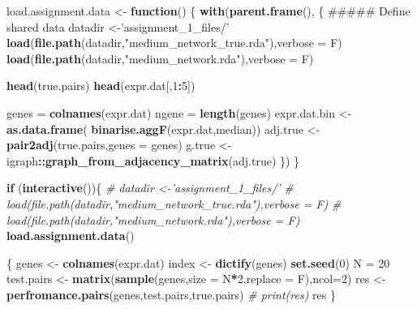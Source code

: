 \documentclass[]{article}
\newenvironment{Shaded}{\begin{snugshade}}{\end{snugshade}}
\newcommand{\KeywordTok}[1]{\textcolor[rgb]{0.13,0.29,0.53}{\textbf{#1}}}
\newcommand{\DataTypeTok}[1]{\textcolor[rgb]{0.13,0.29,0.53}{#1}}
\newcommand{\DecValTok}[1]{\textcolor[rgb]{0.00,0.00,0.81}{#1}}
\newcommand{\StringTok}[1]{\textcolor[rgb]{0.31,0.60,0.02}{#1}}
\newcommand{\CommentTok}[1]{\textcolor[rgb]{0.56,0.35,0.01}{\textit{#1}}}
\newcommand{\ControlFlowTok}[1]{\textcolor[rgb]{0.13,0.29,0.53}{\textbf{#1}}}
\newcommand{\OperatorTok}[1]{\textcolor[rgb]{0.81,0.36,0.00}{\textbf{#1}}}
\newcommand{\NormalTok}[1]{#1}
\theoremstyle{definition}
\theoremstyle{definition}
\theoremstyle{definition}
\theoremstyle{remark}
\begin{document}
\begin{Shaded}
\begin{Highlighting}[]
{{{{{\NormalTok{load.assignment.data <-}\StringTok{ }\ControlFlowTok{function}\NormalTok{()}
\NormalTok{\{}
  \KeywordTok{with}\NormalTok{(}\KeywordTok{parent.frame}\NormalTok{(),}
\NormalTok{       \{}
\NormalTok{         ##### Define shared data}
\NormalTok{         datadir <-}\StringTok{'assignment_1_files/'}
         \KeywordTok{load}\NormalTok{(}\KeywordTok{file.path}\NormalTok{(datadir,}\StringTok{"medium_network_true.rda"}\NormalTok{),}\DataTypeTok{verbose =}\NormalTok{ F)}
         \KeywordTok{load}\NormalTok{(}\KeywordTok{file.path}\NormalTok{(datadir,}\StringTok{"medium_network.rda"}\NormalTok{),}\DataTypeTok{verbose =}\NormalTok{ F)}
         
         \KeywordTok{head}\NormalTok{(true.pairs)}
         \KeywordTok{head}\NormalTok{(expr.dat[,}\DecValTok{1}\OperatorTok{:}\DecValTok{5}\NormalTok{])}
         
\NormalTok{         genes =}\StringTok{ }\KeywordTok{colnames}\NormalTok{(expr.dat)}
\NormalTok{         ngene =}\StringTok{ }\KeywordTok{length}\NormalTok{(genes)}
\NormalTok{         expr.dat.bin <-}\StringTok{ }\KeywordTok{as.data.frame}\NormalTok{( }\KeywordTok{binarise.aggF}\NormalTok{(expr.dat,median))}
\NormalTok{         adj.true <-}\StringTok{ }\KeywordTok{pair2adj}\NormalTok{(true.pairs,}\DataTypeTok{genes =}\NormalTok{ genes)}
\NormalTok{         g.true <-}\StringTok{ }\NormalTok{igraph}\OperatorTok{::}\KeywordTok{graph_from_adjacency_matrix}\NormalTok{(adj.true)}
\NormalTok{       \})}
\NormalTok{\}}

\ControlFlowTok{if}\NormalTok{ (}\KeywordTok{interactive}\NormalTok{())\{}
  \CommentTok{# datadir <-'assignment_1_files/'}
  \CommentTok{# load(file.path(datadir,"medium_network_true.rda"),verbose = F)}
  \CommentTok{# load(file.path(datadir,"medium_network.rda"),verbose = F)}
  \KeywordTok{load.assignment.data}\NormalTok{()}
  
\NormalTok{  \{}
\NormalTok{    genes <-}\StringTok{ }\KeywordTok{colnames}\NormalTok{(expr.dat)}
\NormalTok{    index <-}\StringTok{ }\KeywordTok{dictify}\NormalTok{(genes)}
    \KeywordTok{set.seed}\NormalTok{(}\DecValTok{0}\NormalTok{)}
\NormalTok{    N =}\StringTok{ }\DecValTok{20}
\NormalTok{    test.pairs <-}\StringTok{ }\KeywordTok{matrix}\NormalTok{(}\KeywordTok{sample}\NormalTok{(genes,}\DataTypeTok{size =}\NormalTok{ N}\OperatorTok{*}\DecValTok{2}\NormalTok{,}\DataTypeTok{replace =}\NormalTok{ F),}\DataTypeTok{ncol=}\DecValTok{2}\NormalTok{)}
\NormalTok{    res <-}\KeywordTok{perfromance.pairs}\NormalTok{(genes,test.pairs,true.pairs)}
    \CommentTok{# print(res)}
\NormalTok{    res}
\NormalTok{  \}}
  
}}}}}
\end{Highlighting}
\end{Shaded}
\end{document}
